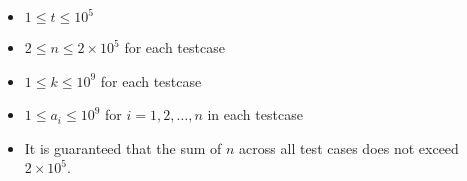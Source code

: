 \begin{itemize}
\tightlist
\item $1 \leq t \leq 10 ^ 5$
\item $2 \leq n \leq 2 \times 10 ^ 5$ for each testcase
\item $1 \leq k \leq 10^9$ for each testcase
\item $1 \leq a_i \leq 10^9$ for $i = 1, 2, \ldots, n$ in each testcase
\item It is guaranteed that the sum of $n$ across all test cases does not exceed $2 \times 10 ^ 5$.
\end{itemize}

